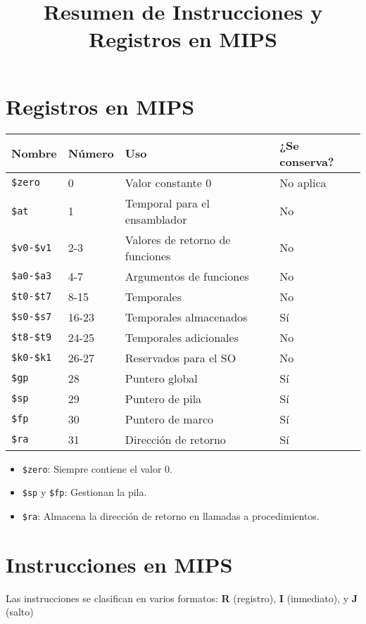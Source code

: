 \documentclass{article}
\title{Resumen de Instrucciones y Registros en MIPS}
\author{}
\date{}
\begin{document}
\maketitle

\section*{Registros en MIPS}

\begin{table}[h]
\centering
\begin{tabular}{|l|l|l|l|}
\hline
\textbf{Nombre} & \textbf{Número} & \textbf{Uso} & \textbf{¿Se conserva?} \\ \hline
\verb|$zero| & 0 & Valor constante 0 & No aplica \\ \hline
\verb|$at| & 1 & Temporal para el ensamblador & No \\ \hline
\verb|$v0-$v1| & 2-3 & Valores de retorno de funciones & No \\ \hline
\verb|$a0-$a3| & 4-7 & Argumentos de funciones & No \\ \hline
\verb|$t0-$t7| & 8-15 & Temporales & No \\ \hline
\verb|$s0-$s7| & 16-23 & Temporales almacenados & Sí \\ \hline
\verb|$t8-$t9| & 24-25 & Temporales adicionales & No \\ \hline
\verb|$k0-$k1| & 26-27 & Reservados para el SO & No \\ \hline
\verb|$gp| & 28 & Puntero global & Sí \\ \hline
\verb|$sp| & 29 & Puntero de pila & Sí \\ \hline
\verb|$fp| & 30 & Puntero de marco & Sí \\ \hline
\verb|$ra| & 31 & Dirección de retorno & Sí \\ \hline
\end{tabular}
\end{table}

\begin{itemize}
    \item \verb|$zero|: Siempre contiene el valor 0.
    \item \verb|$sp| y \verb|$fp|: Gestionan la pila.
    \item \verb|$ra|: Almacena la dirección de retorno en llamadas a procedimientos.
\end{itemize}

\section*{Instrucciones en MIPS}
Las instrucciones se clasifican en varios formatos: \textbf{R} (registro), \textbf{I} (inmediato), y \textbf{J} (salto)
\end{document}
